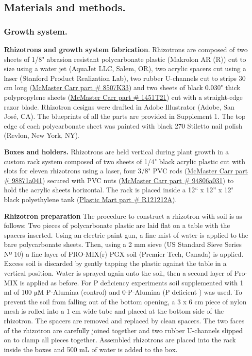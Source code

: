 \documentclass[]{article}
\begin{document}
\subsection{Materials and methods.}\label{materials-and-methods.}

\subsubsection{Growth system.}\label{growth-system.}

\textbf{Rhizotrons and growth system fabrication}. Rhizotrons are
composed of two sheets of 1/8" abrasion resistant polycarbonate plastic
(Makrolon AR (R)) cut to size using a water jet (AquaJet LLC, Salem,
OR), two acrylic spacers cut using a laser (Stanford Product Realization
Lab), two rubber U-channels cut to strips 30 cm long
(\href{http://www.mcmaster.com/\#catalog/121/3838/=wdre76}{McMaster Carr
part \# 8507K33}) and two sheets of black 0.030" thick polypropylene
sheets
(\href{http://www.mcmaster.com/\#catalog/121/3616/=wdrfie}{McMaster Carr
part \# 1451T21}) cut with a straight-edge razor blade. Rhizotron
designs were drafted in Adobe Illustrator (Adobe, San José, CA). The
blueprints of all the parts are provided in Supplement 1. The top edge
of each polycarbonate sheet was painted with black 270 Stiletto nail
polish (Revlon, New York, NY).

\textbf{Boxes and holders.} Rhizotrons are held vertical during plant
growth in a custom rack system composed of two sheets of 1/4" black
acrylic plastic cut with slots for eleven rhizotrons using a laser, four
3/8" PVC rods
(\href{http://www.mcmaster.com/\#98871a041/=wdrftz}{McMaster Carr part
\# 98871a041}) secured with PVC nuts
(\href{http://www.mcmaster.com/\#94806a031/=wdrgar}{McMaster Carr part
\# 94806a031}) to hold the acrylic sheets horizontal. The rack is placed
inside a 12`` x 12'' x 12" black polyethylene tank
(\href{http://www.plastic-mart.com/product/4510/7-gallon-rectangular-tank-r121212a}{Plastic
Mart part \# R121212A}).

\textbf{Rhizotron preparation} The procedure to construct a rhizotron
with soil is as follows: Two pieces of polycarbonate plastic are laid
flat on a table with the spacers inserted. Using an electric paint gun,
a fine mist of water is applied to the bare polycarbonate sheets. Then,
using a 2 mm sieve (US Standard Sieve Series Nº 10) a fine layer of
PRO-MIX(r) PGX soil (Premier Tech, Canada) is applied. Excess soil is
discarded by gently tapping the plastic against the table in a vertical
position. Water is sprayed again onto the soil, then a second layer of
Pro-MIX is applied as before. For P deficiency experiments soil
supplemented with 1 ml of 100 µM P-Alumina (control) and 0-P-Alumina (P
deficient ) was used. To prevent the soil from falling out of the bottom
opening, a 3 x 6 cm piece of nylon mesh is rolled into a 1 cm wide tube
and placed at the bottom side of the rhizotron. The spacers are removed
and replaced by clean spacers. The two faces of the rhizotron are
carefully joined together and two rubber U-channels slipped on to clamp
all pieces together. Assembled rhizotrons are placed into the rack
inside the boxes and 500 mL of water is added to the box.
\end{document}
